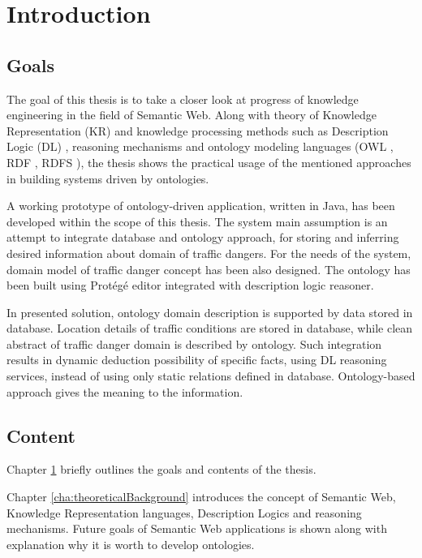 \chapter{Introduction}
\label{cha:introduction}

\section{Goals}
\label{sec:goals}

The goal of this thesis is to take a closer look at progress of knowledge engineering in the field of Semantic Web. Along with theory of Knowledge Representation (KR) \cite{HLP08} and knowledge processing methods such as Description Logic (DL) \cite{BCM03}, reasoning mechanisms and ontology modeling languages (OWL \cite{W3COWL}, RDF \cite{RDFPrimer}, RDFS \cite{RDFSchema}), the thesis shows the practical usage of the mentioned approaches in building systems driven by ontologies. 

A working prototype of ontology-driven application, written in Java, has been developed within the scope of this thesis. The system main assumption is an attempt to integrate database and ontology approach, for storing and inferring desired information about domain of traffic dangers. For the needs of the system, domain model of traffic danger concept has been also designed. The ontology has been built using Protégé \cite{ProtegeHome} editor integrated with description logic reasoner. 

In presented solution, ontology domain description is supported by data stored in database. Location details of traffic conditions are stored in database, while clean abstract of traffic danger domain is described by ontology. Such integration results in dynamic deduction possibility of specific facts, using DL reasoning services, instead of using only static relations defined in database. Ontology-based approach gives the meaning to the information.

\newpage

\section{Content}
\label{sec:content}

Chapter \ref{cha:introduction} briefly outlines the goals and contents of the thesis.

\bigskip

\noindent Chapter \ref{cha:theoreticalBackground} introduces the concept of Semantic Web, Knowledge Representation languages, Description Logics and reasoning mechanisms. Future goals of Semantic Web applications is shown along with explanation why it is worth to develop ontologies.

